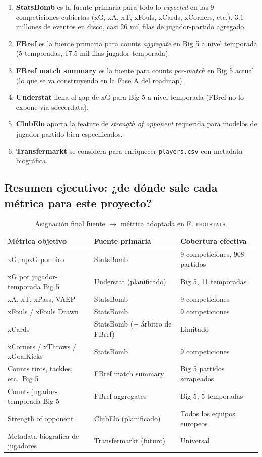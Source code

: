 \begin{enumerate}[label=\textbf{S\arabic*.}]
  \item \textbf{StatsBomb} es la fuente primaria para todo lo \emph{expected} en las 9 competiciones cubiertas (xG, xA, xT, xFouls, xCards, xCorners, etc.). 3.1 millones de eventos en disco, casi 26 mil filas de jugador-partido agregado.
  \item \textbf{FBref} es la fuente primaria para counts \emph{aggregate} en Big 5 a nivel temporada (5 temporadas, 17.5 mil filas jugador-temporada).
  \item \textbf{FBref match summary} es la fuente para counts \emph{per-match} en Big 5 actual (lo que se va construyendo en la Fase A del roadmap).
  \item \textbf{Understat} llena el gap de xG para Big 5 a nivel temporada (FBref no lo expone vía soccerdata).
  \item \textbf{ClubElo} aporta la feature de \emph{strength of opponent} requerida para modelos de jugador-partido bien especificados.
  \item \textbf{Transfermarkt} se considera para enriquecer \texttt{players.csv} con metadata biográfica.
\end{enumerate}

\subsection{Resumen ejecutivo: ¿de dónde sale cada métrica para este proyecto?}

\begin{table}[h]
\centering
\small
\begin{tabular}{lll}
\toprule
\textbf{Métrica objetivo} & \textbf{Fuente primaria} & \textbf{Cobertura efectiva} \\
\midrule
xG, npxG por tiro                 & StatsBomb         & 9 competiciones, 908 partidos \\
xG por jugador-temporada Big 5     & Understat (planificado) & Big 5, 11 temporadas \\
xA, xT, xPass, VAEP                & StatsBomb         & 9 competiciones \\
xFouls / xFouls Drawn              & StatsBomb         & 9 competiciones \\
xCards                             & StatsBomb (+ árbitro de FBref) & Limitado \\
xCorners / xThrows / xGoalKicks    & StatsBomb         & 9 competiciones \\
Counts tiros, tackles, etc.\ Big 5 & FBref match summary & Big 5 partidos scrapeados \\
Counts jugador-temporada Big 5     & FBref aggregates  & Big 5, 5 temporadas \\
Strength of opponent               & ClubElo (planificado) & Todos los equipos europeos \\
Metadata biográfica de jugadores   & Transfermarkt (futuro) & Universal \\
\bottomrule
\end{tabular}
\caption{Asignación final fuente $\to$ métrica adoptada en \textsc{Futbolstats}.}
\end{table}
